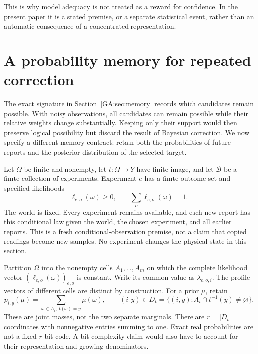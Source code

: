 This is why model adequacy is not treated as a reward for confidence. In the present paper it is a stated premise, or a separate statistical event, rather than an automatic consequence of a concentrated representation.

\section{A probability memory for repeated correction}\label{GA:sec:likelihoodmemory}
The exact signature in Section~\ref{GA:sec:memory} records which candidates remain possible. With noisy observations, all candidates can remain possible while their relative weights change substantially. Keeping only their support would then preserve logical possibility but discard the result of Bayesian correction. We now specify a different memory contract: retain both the probabilities of future reports and the posterior distribution of the selected target.

Let $\Omega$ be finite and nonempty, let $t:\Omega\to Y$ have finite image, and let $\mathcal B$ be a finite collection of experiments. Experiment $e$ has a finite outcome set and specified likelihoods
\[
\ell_{e,o}(\omega)\ge0,\qquad \sum_o\ell_{e,o}(\omega)=1.
\]
The world is fixed. Every experiment remains available, and each new report has this conditional law given the world, the chosen experiment, and all earlier reports. This is a fresh conditional-observation premise, not a claim that copied readings become new samples. No experiment changes the physical state in this section.

Partition $\Omega$ into the nonempty cells $A_1,\ldots,A_m$ on which the complete likelihood vector $(\ell_{e,o}(\omega))_{e,o}$ is constant. Write its common value as $\lambda_{e,o,i}$. The profile vectors of different cells are distinct by construction. For a prior $\mu$, retain
\[
p_{i,y}(\mu)=\sum_{\omega\in A_i,\ t(\omega)=y}\mu(\omega),
\qquad (i,y)\in D_t=\{(i,y):A_i\cap t^{-1}(y)\ne\varnothing\}.
\]
These are joint masses, not the two separate marginals. There are $r=|D_t|$ coordinates with nonnegative entries summing to one. Exact real probabilities are not a fixed $r$-bit code. A bit-complexity claim would also have to account for their representation and growing denominators.


